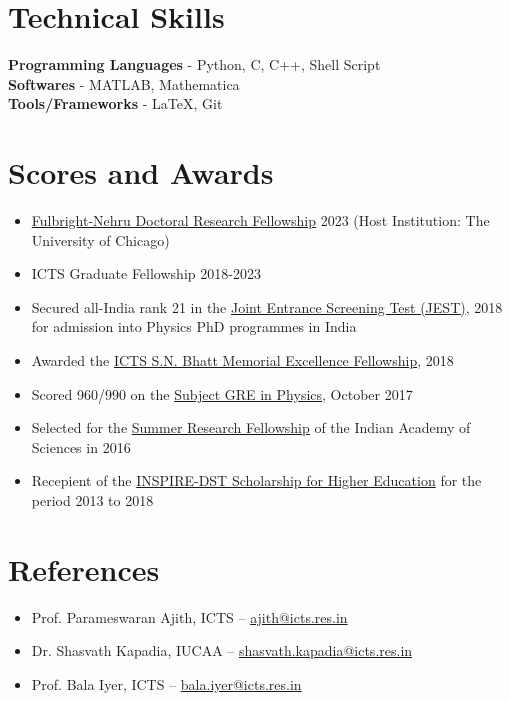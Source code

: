 \documentclass[11pt, margin, centered, letterpaper]{res}
\begin{document}
\begin{resume}
\begin{itemize}[leftmargin=*]
\end{itemize}




\section{Technical \hspace{2mm} Skills}
\textbf{Programming Languages} - Python, C, C++, Shell Script\\
\textbf{Softwares} - MATLAB, Mathematica \\
\textbf{Tools/Frameworks} - \LaTeX, Git



\section{Scores and Awards}
\begin{itemize}[leftmargin=*]
 \item \href{https://www.usief.org.in/Fulbright-Nehru-Doctoral-Research-Fellowships.aspx}{Fulbright-Nehru Doctoral Research Fellowship} 2023 (Host Institution: The University of Chicago)
 \item ICTS Graduate Fellowship 2018-2023
 \item Secured all-India rank 21 in the \href{https://www.jest.org.in/}{Joint Entrance Screening Test (JEST)}, 2018 for admission into Physics PhD programmes in India
 \item Awarded the \href{https://www.icts.res.in/academic/summer-research-program}{ICTS S.N. Bhatt Memorial Excellence Fellowship}, 2018
 \item Scored 960/990 on the \href{https://www.ets.org/gre/subject/about/content/physics}{Subject GRE in Physics}, October 2017
 \item Selected for the \href{http://web-japps.ias.ac.in:8080/fellowship2018/}{Summer Research Fellowship} of the Indian Academy of Sciences in 2016
 \item Recepient of the \href{http://www.inspire-dst.gov.in/scholarship.html}{INSPIRE-DST Scholarship for Higher Education} for the period 2013 to 2018
\end{itemize}

\section{References}
\begin{itemize}[leftmargin=*]
 \item Prof. Parameswaran Ajith, ICTS -- \href{mailto:ajith@icts.res.in}{ajith@icts.res.in}
 \item Dr. Shasvath Kapadia, IUCAA -- \href{mailto:shasvath.kapadia@iucaa.in}{shasvath.kapadia@icts.res.in}
 \item Prof. Bala Iyer, ICTS -- \href{mailto:bala.iyer@icts.res.in}{bala.iyer@icts.res.in}
\end{itemize}
\end{resume}
\end{document}
